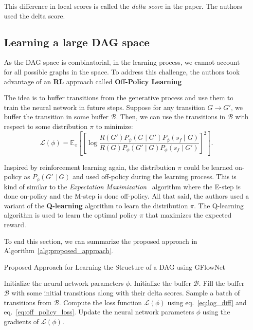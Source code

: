\documentclass{lxaiproposal}
\begin{document}
    This difference in local scores is called the \textit{delta score} in the paper. The authors used the delta score.

    \subsection{Learning a large DAG space}
    \vspace*{-3mm}

    As the DAG space is combinatorial, in the learning process, we cannot account for all possible graphs in the
    space. To address this challenge, the authors took advantage of an \textbf{RL} approach called \textbf{
        Off-Policy Learning}

    The idea is to buffer transitions from the generative process and use them to train the neural network in future
    steps. Suppose for any transition $G \to G'$, we buffer the transition in some buffer $\mathcal{B}$.
    Then, we can use the transitions in $\mathcal{B}$ with respect to some distribution $\pi$ to minimize:
    \begin{equation}
        \mathcal{L}(\phi) = \mathbb{E}_{\pi} \left[ \left[ \log
        \frac{R(G')P_{\psi}(G \mid G')P_{\phi}(s_f \mid G)}{R(G)P_{\phi}(G' \mid G)P_{\phi}(s_f \mid G')} \right]^2 \right].
        \label{eq:off_policy_loss}

    \end{equation}

    Inspired by reinforcement learning again, the distribution $\pi$ could be learned on-policy as
    $P_{\phi}(G' \mid G)$ and used off-policy during the learning process. This is kind of similar to the \textit{
        Expectation Maximization}~\cite{dempster1977maximumlikelihood} algorithm where the E-step is done on-policy and
    the M-step is done off-policy.
    All that said, the authors used a variant of the \textbf{Q-learning} algorithm to learn the distribution $\pi$.
    The Q-learning algorithm is used to learn the optimal policy $\pi$ that maximizes the expected reward.

    To end this section, we can summarize the proposed approach in Algorithm~\ref{alg:proposed_approach}.
    \begin{algorithm}
        \caption{Proposed Approach for Learning the Structure of a DAG using GFlowNet}
        \label{alg:proposed_approach}
        \begin{algorithmic}[1]
            \State Initialize the neural network parameters $\phi$.
            \State Initialize the buffer $\mathcal{B}$.
            \State Fill the buffer $\mathcal{B}$ with some initial transitions along with their delta scores.
                \State Sample a batch of transitions from $\mathcal{B}$.
                \State Compute the loss function $\mathcal{L}(\phi)$ using eq.~\eqref{eq:log_diff} and eq.~\eqref{eq:off_policy_loss}.
                \State Update the neural network parameters $\phi$ using the gradients of $\mathcal{L}(\phi)$.
            \EndWhile
        \end{algorithmic}
    \end{algorithm}
\end{document}

